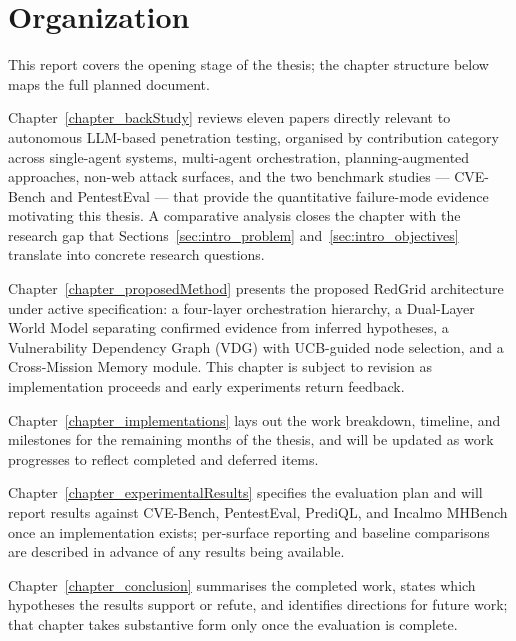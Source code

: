 \section{Organization}
\label{sec:intro_organization}

This report covers the opening stage of the thesis; the chapter structure below maps the full planned document.

Chapter~\ref{chapter_backStudy} reviews eleven papers directly relevant to autonomous LLM-based penetration testing, organised by contribution category across single-agent systems, multi-agent orchestration, planning-augmented approaches, non-web attack surfaces, and the two benchmark studies --- CVE-Bench \citep{zhu2025cvebench} and PentestEval \citep{yang2025pentesteval} --- that provide the quantitative failure-mode evidence motivating this thesis. A comparative analysis closes the chapter with the research gap that Sections~\ref{sec:intro_problem} and~\ref{sec:intro_objectives} translate into concrete research questions.

Chapter~\ref{chapter_proposedMethod} presents the proposed RedGrid architecture under active specification: a four-layer orchestration hierarchy, a Dual-Layer World Model separating confirmed evidence from inferred hypotheses, a Vulnerability Dependency Graph (VDG) with UCB-guided node selection, and a Cross-Mission Memory module. This chapter is subject to revision as implementation proceeds and early experiments return feedback.

Chapter~\ref{chapter_implementations} lays out the work breakdown, timeline, and milestones for the remaining months of the thesis, and will be updated as work progresses to reflect completed and deferred items.

Chapter~\ref{chapter_experimentalResults} specifies the evaluation plan and will report results against CVE-Bench, PentestEval, PrediQL, and Incalmo MHBench once an implementation exists; per-surface reporting and baseline comparisons are described in advance of any results being available.

Chapter~\ref{chapter_conclusion} summarises the completed work, states which hypotheses the results support or refute, and identifies directions for future work; that chapter takes substantive form only once the evaluation is complete.
